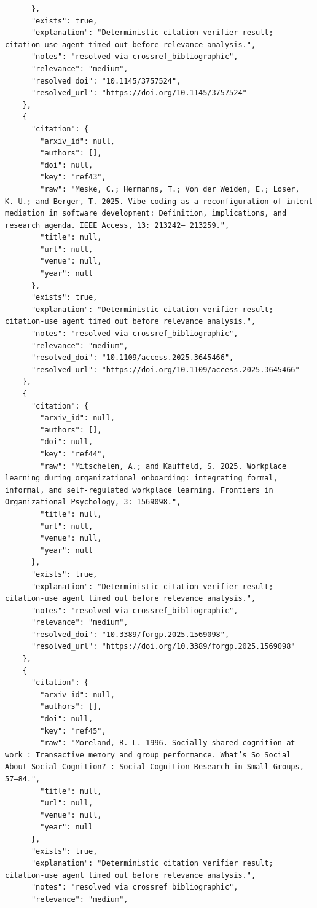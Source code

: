 \documentclass[11pt]{article}
\begin{document}
\begin{verbatim}
      },
      "exists": true,
      "explanation": "Deterministic citation verifier result; citation-use agent timed out before relevance analysis.",
      "notes": "resolved via crossref_bibliographic",
      "relevance": "medium",
      "resolved_doi": "10.1145/3757524",
      "resolved_url": "https://doi.org/10.1145/3757524"
    },
    {
      "citation": {
        "arxiv_id": null,
        "authors": [],
        "doi": null,
        "key": "ref43",
        "raw": "Meske, C.; Hermanns, T.; Von der Weiden, E.; Loser, K.-U.; and Berger, T. 2025. Vibe coding as a reconfiguration of intent mediation in software development: Definition, implications, and research agenda. IEEE Access, 13: 213242– 213259.",
        "title": null,
        "url": null,
        "venue": null,
        "year": null
      },
      "exists": true,
      "explanation": "Deterministic citation verifier result; citation-use agent timed out before relevance analysis.",
      "notes": "resolved via crossref_bibliographic",
      "relevance": "medium",
      "resolved_doi": "10.1109/access.2025.3645466",
      "resolved_url": "https://doi.org/10.1109/access.2025.3645466"
    },
    {
      "citation": {
        "arxiv_id": null,
        "authors": [],
        "doi": null,
        "key": "ref44",
        "raw": "Mitschelen, A.; and Kauffeld, S. 2025. Workplace learning during organizational onboarding: integrating formal, informal, and self-regulated workplace learning. Frontiers in Organizational Psychology, 3: 1569098.",
        "title": null,
        "url": null,
        "venue": null,
        "year": null
      },
      "exists": true,
      "explanation": "Deterministic citation verifier result; citation-use agent timed out before relevance analysis.",
      "notes": "resolved via crossref_bibliographic",
      "relevance": "medium",
      "resolved_doi": "10.3389/forgp.2025.1569098",
      "resolved_url": "https://doi.org/10.3389/forgp.2025.1569098"
    },
    {
      "citation": {
        "arxiv_id": null,
        "authors": [],
        "doi": null,
        "key": "ref45",
        "raw": "Moreland, R. L. 1996. Socially shared cognition at work : Transactive memory and group performance. What’s So Social About Social Cognition? : Social Cognition Research in Small Groups, 57–84.",
        "title": null,
        "url": null,
        "venue": null,
        "year": null
      },
      "exists": true,
      "explanation": "Deterministic citation verifier result; citation-use agent timed out before relevance analysis.",
      "notes": "resolved via crossref_bibliographic",
      "relevance": "medium",

\end{verbatim}
\end{document}
